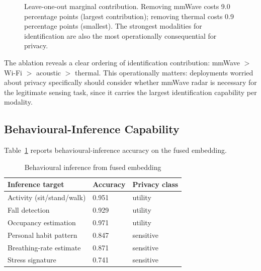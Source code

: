 \documentclass[sigconf,nonacm]{acmart}
\begin{document}
\begin{figure}[h]
\centering
{}
\caption{Leave-one-out marginal contribution. Removing mmWave costs
  9.0 percentage points (largest contribution); removing thermal
  costs 0.9 percentage points (smallest). The strongest modalities
  for identification are also the most operationally consequential
  for privacy.}
\label{fig:ablation}
\end{figure}

The ablation reveals a clear ordering of identification
contribution: mmWave $>$ Wi-Fi $>$ acoustic $>$ thermal. This
operationally matters: deployments worried about privacy
specifically should consider whether mmWave radar is necessary
for the legitimate sensing task, since it carries the largest
identification capability per modality.

\subsection{Behavioural-Inference Capability}

Table~\ref{tab:behav} reports behavioural-inference accuracy on
the fused embedding.

\begin{table}[h]
\caption{Behavioural inference from fused embedding}
\label{tab:behav}
\small
\begin{tabularx}{\columnwidth}{@{}p{2.6cm}X X@{}}
\toprule
\textbf{Inference target} & \textbf{Accuracy} & \textbf{Privacy class} \\
\midrule
Activity (sit/stand/walk) & 0.951 & utility \\
Fall detection            & 0.929 & utility \\
Occupancy estimation      & 0.971 & utility \\
\midrule
Personal habit pattern    & 0.847 & sensitive \\
Breathing-rate estimate   & 0.871 & sensitive \\
Stress signature          & 0.741 & sensitive \\
\bottomrule
\end{tabularx}
\end{table}
\end{document}
